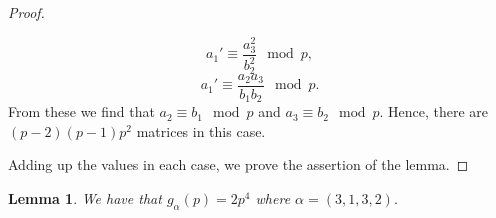 \documentclass[a4paper]{amsart}
\newtheorem{lemma}[theorem]{Lemma}
\numberwithin{equation}{section}
\theoremstyle{remark}
\begin{document}
\begin{proof}
\begin{itemize}
        \begin{equation*}
              a_1' \equiv \frac{a_3^2}{b_2^2} \mod p, 
        \end{equation*}
        \begin{equation*}
            a_1' \equiv \frac{a_2a_3}{b_1b_2} \mod p.
        \end{equation*}
        From these we find that $a_2 \equiv b_1 \mod p$ and $a_3 \equiv b_2 \mod p$. Hence, there are $(p-2)(p-1)p^2$ matrices in this case.
    \end{itemize}
    Adding up the values in each case, we prove the assertion of the lemma.
\end{proof}

\begin{lemma}\label{prev lemma}
    We have that $g_{\alpha}(p) = 2p^4$ where $\alpha = (3,1,3,2).$
\end{lemma}
\end{document}
